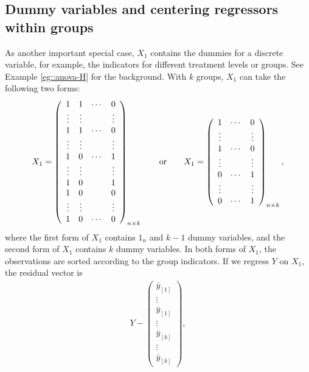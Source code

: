 \subsection{Dummy variables and centering regressors within groups}



As another important special case, $X_{1}$ contains the dummies for
a discrete variable, for example, the indicators for different treatment
levels or groups. 
See Example \ref{eg::anova-H} for the background. 
With $k$ groups, $X_{1}$ can take the following
two forms:
\begin{eqnarray}\label{eq::discrete-regressor-dummy}
X_{1}=\left(\begin{array}{cccc}
1 & 1 & \cdots & 0\\
\vdots & \vdots &  & \vdots\\
1 & 1 & \cdots & 0\\
\vdots & \vdots &  & \vdots\\
1 & 0 & \cdots & 1\\
\vdots & \vdots &  & \vdots\\
1 & 0 &  & 1\\
1 & 0 &  & 0\\
\vdots & \vdots &  & \vdots\\
1 & 0 & \cdots & 0
\end{array}\right)_{n\times k}\qquad\text{or}\qquad X_{1}=\left(\begin{array}{ccc}
1 & \cdots & 0\\
\vdots &  & \vdots\\
1 & \cdots & 0\\
\vdots &  & \vdots\\
0 & \cdots & 1\\
\text{\ensuremath{\vdots}} &  & \vdots\\
0 & \cdots & 1
\end{array}\right)_{n\times k},
\end{eqnarray}
where the first form of $X_1$ contains $1_{n}$ and $k-1$ dummy variables,
and the second form of $X_1$ contains $k$ dummy variables. In both forms
of $X_{1}$, the observations are sorted according to the group indicators.
If we regress $Y$ on $X_{1}$, the residual vector is 
\begin{eqnarray}\label{eq::centeringbyK}
Y - 
\left(\begin{array}{c}
 \bar{y}_{[1]}\\
\vdots\\
 \bar{y}_{[1]}\\
\vdots\\
 \bar{y}_{[k]}\\
\vdots\\
 \bar{y}_{[k]}
\end{array}\right),
\end{eqnarray}
